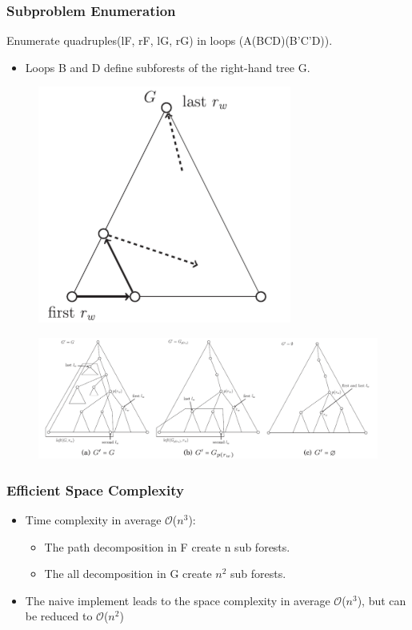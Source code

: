 \documentclass{beamer}
\begin{document}
\begin{frame}
\frametitle{Subproblem Enumeration}
Enumerate quadruples(lF, rF, lG, rG) in loops (A(BCD)(B'C'D)).
\begin{itemize}
\item Loops B and D define subforests of the right-hand tree G.
\end{itemize}
\begin{figure}
	\includegraphics[width=0.2\linewidth]{Bloop}
	\label{Bloop} 
	\centering
\end{figure}
\begin{figure}
	\includegraphics[width=0.8\linewidth]{Dloop}
	\label{Dloop} 
	\centering
\end{figure}
\end{frame}
\begin{frame}
\frametitle{Efficient Space Complexity}
\begin{itemize}
\item Time complexity in average $\mathcal{O}$($n^3$):
\begin{itemize}
\item The path decomposition in F create n sub forests.
\item The all decomposition in G create $n^2$ sub forests.
\end{itemize}
\item The naive implement leads to the space complexity in average $\mathcal{O}$($n^3$), but can be reduced to $\mathcal{O}$($n^2$)
\end{itemize}

\end{frame}
\end{document}

